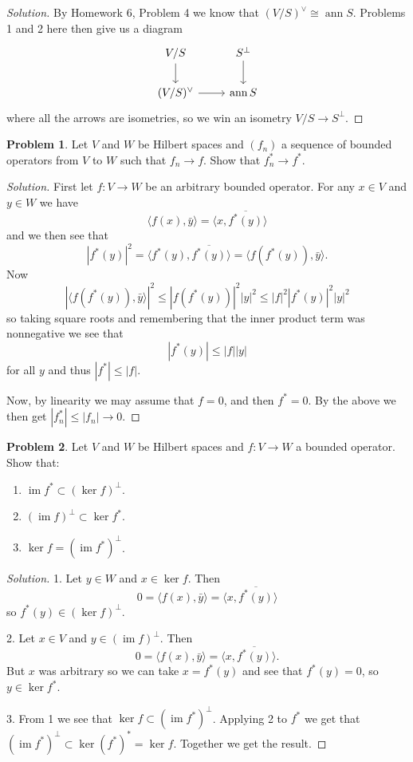 \documentclass[11pt]{article}
\theoremstyle{definition}
\newtheorem{prob}{Problem}
\def\<{\langle}
\def\>{\rangle}
\DeclareMathOperator{\im}{im}
\DeclareMathOperator{\ann}{ann}
\begin{document}
\begin{proof}[Solution]
	By Homework 6, Problem 4 we know that $(V/S)^\vee \cong \ann S$.
	Problems 1 and 2 here then give us a diagram
	\[
		\begin{tikzcd}
			V/S \ar[d] & S^\perp \ar[d]
			\\
			(V/S)^\vee \ar[r] & \ann S
		\end{tikzcd}
	\]
	where all the arrows are isometries, so we win an isometry $V/S \to S^\perp$.
\end{proof}

\begin{prob}
	Let $V$ and $W$ be Hilbert spaces and $(f_n)$ a sequence of bounded operators from $V$ to $W$ such that $f_n \to f$.
	Show that $f_n^* \to f^*$.
\end{prob}

\begin{proof}[Solution]
	First let $f : V \to W$ be an arbitrary bounded operator.
	For any $x \in V$ and $y \in W$ we have
	\[
		\< f(x), \bar y \> = \< x, \overline{f^*(y)} \>
	\]
	and we then see that
	\[
		|f^*(y)|^2
		= \< f^*(y), \overline{f^*(y)} \>
		= \< f(f^*(y)), \bar y \>.
	\]
	Now
	\[
		|\< f(f^*(y)), \bar y \>|^2
		\leq |f(f^*(y))|^2 |y|^2
		\leq |f|^2 |f^*(y)|^2 |y|^2
	\]
	so taking square roots and remembering that the inner product term was nonnegative we see that
	\[
		|f^*(y)|
		\leq |f| |y|
	\]
	for all $y$
	and thus $|f^*| \leq |f|$.

	Now, by linearity we may assume that $f = 0$, and then $f^* = 0$.
	By the above we then get $|f_n^*| \leq |f_n| \to 0$.
\end{proof}

\begin{prob}
	Let $V$ and $W$ be Hilbert spaces and $f : V \to W$ a bounded operator.
	Show that:
	\begin{enumerate}
		\item $\im f^* \subset (\ker f)^\perp$.
		\item $(\im f)^\perp \subset \ker f^*$.
		\item $\ker f = (\im f^*)^\perp$.
	\end{enumerate}
\end{prob}

\begin{proof}[Solution]
	1. Let $y \in W$ and $x \in \ker f$. Then
	\[
		0 = \< f(x), \bar y \> = \< x, \overline{f^*(y)} \>
	\]
	so $f^*(y) \in (\ker f)^\perp$.

	2. Let $x \in V$ and $y \in (\im f)^\perp$. Then
	\[
		0 = \< f(x), \bar y \> = \< x, \overline{f^*(y)} \>.
	\]
	But $x$ was arbitrary so we can take $x = f^*(y)$ and see that $f^*(y) = 0$, so $y \in \ker f^*$.

	3. From 1 we see that $\ker f \subset (\im f^*)^\perp$.
	Applying 2 to $f^*$ we get that $(\im f^*)^\perp \subset \ker (f^*)^* = \ker f$.
	Together we get the result.
\end{proof}
\end{document}
